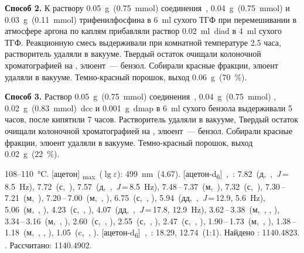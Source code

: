 \textbf{Способ 2.}
К раствору \SI{0.05}{\gram}~(\SI{0.75}{\milli\mole}) соединения~, \SI{0.04}{\gram}~(\SI{0.75}{\milli\mole})  и \SI{0.03}{\gram}~(\SI{0.11}{\milli\mole}) трифенилфосфина в \SI{6}{\milli\litre} сухого ТГФ при перемешивании в атмосфере аргона по каплям прибавляли раствор \SI{0.02}{\milli\litre}~\ac{diad} в \SI{4}{\milli\litre} сухого ТГФ. Реакционную смесь выдерживали при комнатной температуре 2.5 часа, растворитель удаляли в вакууме. Твердый остаток очищали колоночной хроматографией на , элюент~--- бензол. Собирали красные фракции, элюент удаляли в вакууме. Темно-красный порошок, выход \SI{0.06}{\gram}~(\SI{70}{\percent}).

\textbf{Способ 3.}
Раствор \SI{0.05}{\gram}~(\SI{0.75}{\milli\mole}) соединения~, \SI{0.04}{\gram}~(\SI{0.75}{\milli\mole}) , \SI{0.02}{\gram}~(\SI{0.83}{\milli\mole})~\ac{dcc} и \SI{0.001}{\gram}~\ac{dmap} в \SI{6}{\milli\litre} сухого бензола выдерживали 5 часов, после кипятили 7 часов. Растворитель удаляли в вакууме, Твердый остаток очищали колоночной хроматографией на , элюент~--- бензол. Собирали красные фракции, элюент удаляли в вакууме. Темно-красный порошок, выход \SI{0.02}{\gram}~(\SI{22}{\percent}).
\begin{experimental}
     108--\SI{110}{\celsius}.
    [ацетон] \chemlambda\textsubscript{max}~($\lg \varepsilon$): \SI{499}{\nano\metre}~(4.67).
    [ацетон-d\textsubscript{6}]~\chemdelta,~\si{\ppm}: 7.82~(д,~,~\textit{J}\,=\,8.5~\si{\hertz}), 7.72~(с,~), 7.57~(д,~,~\textit{J}\,=\,8.5~\si{\hertz}), 7.48\,--\,7.37~(м,~), 7.32~(с,~), 7.30\,--\,7.21~(м,~), 7.20\,--\,7.00~(м,~, ), 6.75~(с,~, ), 5.94~(дд,~,~\textit{J}\,=\,12.9, 5.6~\si{\hertz}), 5.06~(м,~, ), 4.23~(с,~, ), 4.07~(дд,~,~\textit{J}\,=\,17.8, 12.9~\si{\hertz}), 3.62\,--\,3.38~(м,~, , ), 3.34\,--\,3.16~(м,~, ), 2.60~(с,~, ), 2.55~(с,~, ), 2.47~(с,~, ), 1.90\,--\,1.73~(м,~, ), 1.38\,--\,1.18~(м,~, , ), 1.05~(c,~, ).
    [ацетон-d\textsubscript{6}]~\chemdelta,~\si{\ppm}: 18.29, 12.74~(1:1).
     Найдено \ce{[M + H]+}: \num{1140.4823}. . Рассчитано: \ce{[M + H]} \num{1140.4902}.
\end{experimental}


